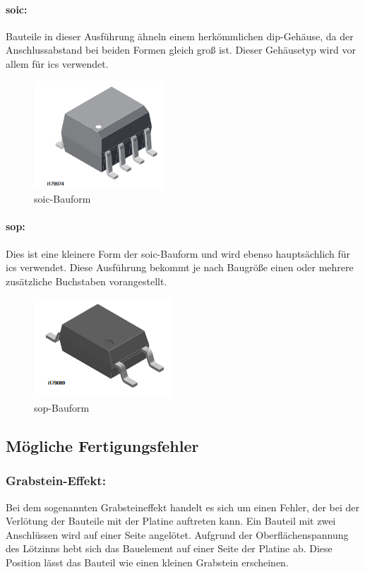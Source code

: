 \paragraph{\ac{soic}:}
Bauteile in dieser Ausführung ähneln einem herkömmlichen \ac{dip}-Gehäuse, da der Anschlussabstand bei beiden Formen gleich groß ist. Dieser Gehäusetyp wird vor allem für \acp{ic} verwendet.
\begin{figure}[htbp!]
	\centering
	\includegraphics{images/technische_grundlagen/soic.png}
	\caption{\ac{soic}-Bauform \cite[vgl.][]{vishay-soic}}
\end{figure}

\paragraph{\ac{sop}:}
Dies ist eine kleinere Form der \ac{soic}-Bauform und wird ebenso hauptsächlich für \acp{ic} verwendet. Diese Ausführung bekommt je nach Baugröße einen oder mehrere zusätzliche Buchstaben vorangestellt.
\begin{figure}[htbp!]
	\centering
	\includegraphics{images/technische_grundlagen/sop.png}
	\caption{\ac{sop}-Bauform \cite[vgl.][]{vishay-sop}}
\end{figure}

\subsection{Mögliche Fertigungsfehler}
\subsubsection{Grabstein-Effekt:} %
Bei dem sogenannten Grabsteineffekt handelt es sich um einen Fehler, der bei der Verlötung der Bauteile mit der Platine auftreten kann.
Ein Bauteil mit zwei Anschlüssen wird auf einer Seite angelötet.
Aufgrund der Oberflächenspannung des Lötzinns hebt sich das Bauelement auf einer Seite der Platine ab.
Diese Position lässt das Bauteil wie einen kleinen Grabstein erscheinen.\par

